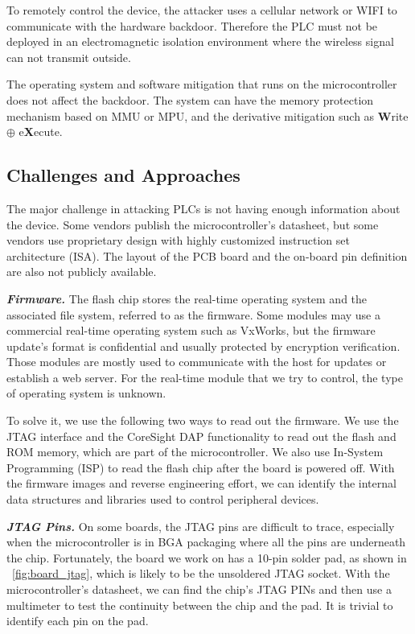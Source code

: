 To remotely control the device, the attacker uses a cellular network or WIFI to communicate with the hardware backdoor. Therefore the PLC must not be deployed in an electromagnetic isolation environment where the wireless signal can not transmit outside.

The operating system and software mitigation that runs on the microcontroller does not affect the backdoor.  The system can have the memory protection mechanism based on MMU or MPU, and the derivative mitigation such as \textbf{W}rite $\oplus$ e\textbf{X}ecute.



\subsection{Challenges and Approaches}

The major challenge in attacking PLCs is not having enough information about the device. Some vendors publish the microcontroller's datasheet, but some vendors use proprietary design with highly customized instruction set architecture (ISA).  The layout of the PCB board and the on-board pin definition are also not publicly available.

\textbf{\textit{Firmware.}} The flash chip stores the real-time operating system and the associated file system, referred to as the firmware. Some modules may use a commercial real-time operating system such as VxWorks, but the firmware update's format is confidential and usually protected by encryption verification. Those modules are mostly used to communicate with the host for updates or establish a web server. For the real-time module that we try to control, the type of operating system is unknown.

To solve it, we use the following two ways to read out the firmware. We use the JTAG interface and the CoreSight DAP functionality to read out the flash and ROM memory, which are part of the microcontroller. We also use In-System Programming (ISP) to read the flash chip after the board is powered off.  With the firmware images and reverse engineering effort, we can identify the internal data structures and libraries used to control peripheral devices.

\textbf{\textit{JTAG Pins.}} On some boards, the JTAG pins are difficult to trace, especially when the microcontroller is in BGA packaging where all the pins are underneath the chip. Fortunately, the board we work on has a 10-pin solder pad, as shown in ~\autoref{fig:board_jtag}, which is likely to be the unsoldered JTAG socket. With the microcontroller's datasheet, we can find the chip's JTAG PINs and then use a multimeter to test the continuity between the chip and the pad. It is trivial to identify each pin on the pad.

